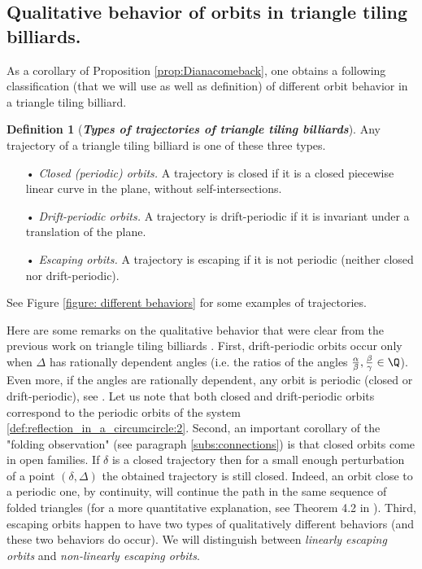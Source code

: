 \documentclass[12pt]{article}
\theoremstyle{definition}
\newtheorem{definition}{Definition}
\begin{document}
\subsection{Qualitative behavior of orbits in triangle tiling billiards.}\label{subs:different}
As a corollary of Proposition \ref{prop:Dianacomeback}, one obtains a following classification (that we will use as well as definition) of different orbit behavior in a triangle tiling billiard.

\begin{definition}[\emph{\textbf{Types of trajectories of triangle tiling billiards}}]\label{def:different_types_of_trajectories}
Any trajectory of a triangle tiling billiard is one of these three types. 
\begin{itemize}
\item[•] \emph{Closed (periodic) orbits. } A trajectory is closed if it is a closed piecewise linear curve in the plane, without self-intersections.
\item[•] \emph{Drift-periodic orbits.} A trajectory is drift-periodic if it is invariant under a translation of the plane.
\item[•] \emph{Escaping orbits.} A trajectory is escaping if it is not periodic (neither closed nor drift-periodic).
\end{itemize}
\end{definition}

See Figure \ref{figure: different behaviors} for some examples of trajectories. 

Here are some remarks on the qualitative behavior that were clear from the previous work on triangle tiling billiards \cite{DDRSL16, BDFI18}. First, drift-periodic orbits occur only when $\Delta$ has rationally dependent angles (i.e. the ratios of the angles $\frac{\alpha}{\beta}, \frac{\beta}{\gamma} \in \Q$). Even more, if the angles are rationally dependent, any orbit is periodic (closed or drift-periodic), see \cite{BDFI18}. Let us note that both closed and drift-periodic orbits correspond to the periodic orbits of the system \ref{def:reflection_in_a_circumcircle:2}. Second, an important corollary of the "folding observation" (see paragraph \ref{subs:connections}) is that closed orbits come in open families. If $\delta$ is a closed trajectory then for a small enough perturbation of a point $(\delta, \Delta)$ the obtained trajectory is still closed. Indeed, an orbit close to a periodic one, by continuity, will continue the path in the same sequence of folded triangles (for a more quantitative explanation, see Theorem 4.2 in \cite{BDFI18}). Third, escaping orbits happen to have two types of qualitatively different behaviors (and these two behaviors do occur). We will distinguish between \emph{linearly escaping orbits} and \emph{non-linearly escaping orbits}. 
\end{document}
